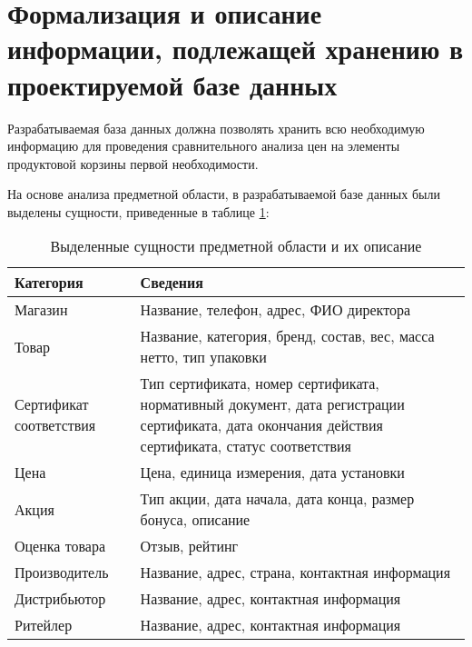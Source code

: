 \clearpage

\section{Формализация и описание информации, подлежащей хранению в проектируемой базе данных}

Разрабатываемая база данных должна позволять хранить всю необходимую информацию для проведения сравнительного анализа цен на элементы продуктовой корзины первой необходимости. 

На основе анализа предметной области, в разрабатываемой базе данных были выделены сущности, приведенные в таблице \ref{tbl:db_entities}: 

\begin{table}[ht]
	\begin{center}
		\begin{threeparttable}
			\caption{Выделенные сущности предметной области и их описание}
			\label{tbl:db_entities}
			\begin{tabular}{|p{4.5cm}|p{10cm}|}
				\hline
				\textbf{Категория} & \textbf{Сведения} \\ \hline
				Магазин & Название, телефон, адрес, ФИО директора \\ 
				\hline
				Товар & Название, категория, бренд, состав, вес, масса нетто, тип упаковки \\ 
				\hline
				Сертификат соответствия & Тип сертификата, номер сертификата, нормативный документ, дата регистрации сертификата, дата окончания действия сертификата, статус соответствия \\ 
				\hline
				Цена & Цена, единица измерения, дата установки  \\ 
				\hline
				Акция & Тип акции, дата начала, дата конца, размер бонуса, описание \\ 
				\hline
				Оценка товара & Отзыв, рейтинг \\ 
				\hline
				Производитель & Название, адрес, страна, контактная информация \\ 
				\hline
				Дистрибьютор & Название, адрес, контактная информация \\ 
				\hline
				Ритейлер & Название, адрес, контактная информация \\ 
				\hline
			\end{tabular}
		\end{threeparttable}
	\end{center}
\end{table}

